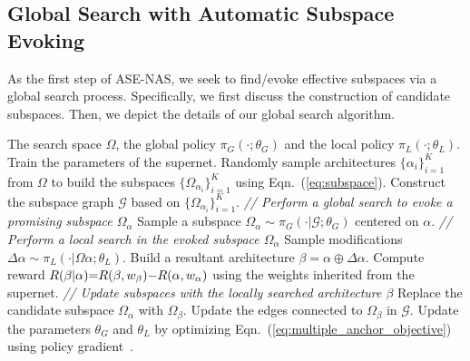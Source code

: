 \documentclass[lettersize,journal]{IEEEtran}
\newcommand{\sexyname}{ASE-NAS\xspace}
\def\mG{{\mathcal G}}
\begin{document}
\subsection{Global Search with Automatic Subspace Evoking}
\label{sec:global_search}

As the first step of \sexyname,
we seek to find/evoke effective subspaces via a global search process. Specifically, we first discuss the construction of candidate subspaces. Then, we depict the details of our global search algorithm. 

\begin{algorithm}[t]
	\caption{\small{Training method for \sexyname}.}
    	\begin{algorithmic}[1]\small
            \REQUIRE The search space $\Omega$, the global policy $\pi_G(\cdot;\theta_G)$ and the local policy $\pi_L(\cdot;\theta_L)$.
            \STATE Train the parameters of the supernet.
            \STATE Randomly sample architectures $\{\alpha_i\}_{i=1}^{K}$ from $\Omega$ to build the subspaces $\{\Omega_{\alpha_i}\}_{i=1}^{K}$ using Eqn.~(\ref{eq:subspace}).
            \STATE Construct the subspace graph $\mG$ based on $\{\Omega_{\alpha_i}\}_{i=1}^{K}$.
                \STATE \emph{// Perform a global search to evoke a promising subspace $\Omega_{\alpha}$}
                \STATE Sample a subspace $\Omega_{\alpha} \sim \pi_{G}(\cdot | \mG; \theta_{G})$ centered on $\alpha$.
                \STATE \emph{// Perform a local search in the evoked subspace $\Omega_{\alpha}$}
                \STATE Sample modifications $\Delta \alpha \sim \pi_{L}(\cdot | \Omega{\alpha}; \theta_{L})$.
                \STATE Build a resultant architecture $\beta = \alpha \oplus \Delta\alpha$.
                \STATE Compute reward $R(\beta|\alpha)\small{=}R(\beta,w_{\beta}) \small{-} R(\alpha,w_{\alpha})$ using the weights inherited from the supernet. 
                \STATE \emph{// Update subspaces with the locally searched architecture $\beta$}
                    \STATE Replace the candidate subspace $\Omega_{\alpha}$ with $\Omega_{\beta}$.
                    \STATE Update the edges connected to $\Omega_{\beta}$ in $\mG$.
                \ENDIF
                \STATE Update the parameters $\theta_G$ and $\theta_L$ by optimizing Eqn.~(\ref{eq:multiple_anchor_objective}) using policy gradient~\cite{williams1992simple}.
            \ENDWHILE
    	\end{algorithmic}
		\label{alg:training}
\end{algorithm}
\end{document}
